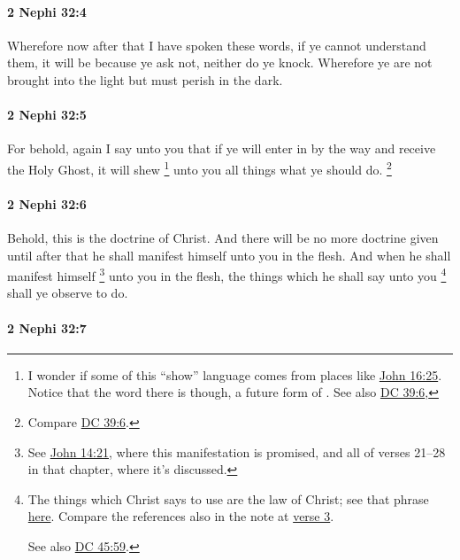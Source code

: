 		\paragraph{2 Nephi 32:4} %
			\label{2NEPHI-32-4}

			Wherefore now after that I have spoken these words,
			if ye cannot understand them,
			it will be because ye ask not, neither do ye knock.
			Wherefore ye are not brought into the light
			but must perish in the dark.

		\paragraph{2 Nephi 32:5} %
			\label{2NEPHI-32-5}

			For behold, again I say unto you
			that if ye will enter in by the way and receive the Holy Ghost,
			it will shew%
				\footnote{%
					I wonder if some of this ``show'' language comes from places like \hyperref[JOHN-16-25]{John 16:25}. Notice that the word there is  though, a future form of . See also \hyperref[DC39-6]{DC 39:6}, 
					}
			unto you all things what ye should do.%
				\footnote{%
					Compare \hyperref[DC39-6]{DC 39:6}.
					}

		\paragraph{2 Nephi 32:6}
			\label{2NEPHI-32-6}
			
			Behold, this is the doctrine of Christ.
			And there will be no more doctrine given
			until after that he shall manifest himself unto you in the flesh.
			And when he shall manifest himself%
				\footnote{%
					See \hyperref[JOHN-14-21]{John 14:21}, where this manifestation is promised, and all of verses 21--28 in that chapter, where it's discussed.
					}
			unto you in the flesh,
			the things which he shall say unto you%
				\footnote{%
					\label{2NEPHI-32-6-say}%
					The things which Christ says to use are the law of Christ; see that phrase \hyperref[LAW-PHRASES]{here}. Compare the references also in the note at \hyperref[2NEPHI32-3]{verse 3}.
					
					See also \hyperref[DC45-59]{DC 45:59}.
					}
			shall ye observe to do.

		\paragraph{2 Nephi 32:7} %
			\label{2NEPHI-32-7}

